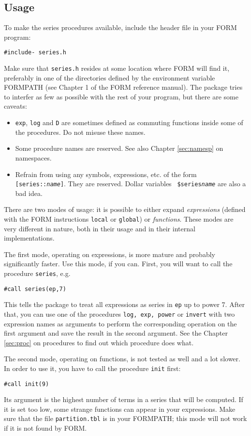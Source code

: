 \documentclass{article}
\begin{document}
\subsection{Usage}
\label{sec:usage}

To make the series procedures available, include the header file in your
FORM program:
\begin{verbatim}
#include- series.h
\end{verbatim}
Make sure that {\tt series.h} resides at some location where FORM will find
it, preferably in one of the directories defined by the environment
variable \mbox{FORMPATH} (see Chapter 1 of the FORM reference manual). The
package tries to interfer as few as possible with the rest of your
program, but there are some caveats:
\begin{itemize}
\item {\tt exp}, {\tt log} and {\tt D} are sometimes defined as commuting
  functions inside some of the procedures. Do not misuse these names.
\item Some procedure names are reserved. See also Chapter
  \ref{sec:namesp} on namespaces.
\item Refrain from  using any symbols, expressions, etc. of the form
  {\tt[series::{\it name}]}. They are reserved. Dollar variables {\tt
    \$series{\it name}} are also a bad idea.
\end{itemize}

There are two modes of usage: it is possible to either expand {\em expressions}
(defined with the FORM instructions {\tt local} or {\tt global}) or {\em
  functions}. These modes are very different in nature, both in their
usage and in their internal implementations. 

The first mode, operating on expressions, is more mature and probably
significantly faster. Use this mode, if you can. First, you will want to
call the procedure {\tt series}, e.g.
\begin{verbatim}
#call series(ep,7)
\end{verbatim}
This tells the package to treat all expressions as series in {\tt ep} up
to power 7. After that, you can use one of the procedures {\tt log, exp,
  power} or {\tt invert} with two expression names as arguments to perform the
corresponding operation on the first argument and save the result in the
second argument. See the Chapter \ref{sec:proc} on procedures to find
out which procedure does what.

\medskip

The second mode, operating on functions, is not tested as well and
 a lot slower. In order to use it, you have to call the
procedure {\tt init} first:
\begin{verbatim}
#call init(9)
\end{verbatim}
Its argument is the highest number of terms in a series that will be
computed. If it is set too low, some strange functions can appear in
your expressions. Make sure that the file {\tt partition.tbl} is in your
FORMPATH; this mode will not work if it is not found by FORM.
\end{document}
